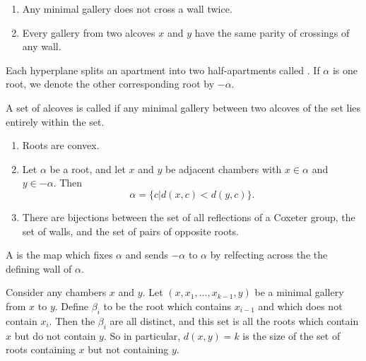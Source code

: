 \documentclass[11pt]{article}
\begin{document}
\begin{lemma}
    \begin{enumerate}
        \item Any minimal gallery does not cross a wall twice.
        \item Every gallery from two alcoves $x$ and $y$ have the same parity of crossings of any wall.
    \end{enumerate}
\end{lemma}

\begin{definition}
    Each hyperplane splits an apartment into two half-apartments called . If $\alpha$ is one root, we denote the other corresponding root by $-\alpha$. 
\end{definition}


\begin{definition}
    A set of alcoves is called  if any minimal gallery between two alcoves of the set lies entirely within the set. 
\end{definition}

\begin{proposition}
    \begin{enumerate}
        \item Roots are convex.
        \item Let $\alpha$ be a root, and let $x$ and $y$ be adjacent chambers with $x\in\alpha$ and $y\in -\alpha$. Then
        \[\alpha =\{c|d(x,c)<d(y,c)\}.\]
        \item There are bijections between the set of all reflections of a Coxeter group, the set of walls, and the set of pairs of opposite roots.
    \end{enumerate}
\end{proposition}

\begin{definition}
    A  is the map which fixes $\alpha$ and sends $-\alpha$ to $\alpha$ by relfecting across the the defining wall of $\alpha$. 
\end{definition}

\begin{proposition}
    Consider any chambers $x$ and $y$. Let $(x,x_1,...,x_{k-1},y)$ be a minimal gallery from $x$ to $y$. Define $\beta_i$ to be the root which contains $x_{i-1}$ and which does not contain $x_i$. Then the $\beta_i$ are all distinct, and this set is all the roots which contain $x$ but do not contain $y$. So in particular, $d(x,y)=k$ is the size of the set of roots containing $x$ but not containing $y$. 
\end{proposition}
\end{document}
